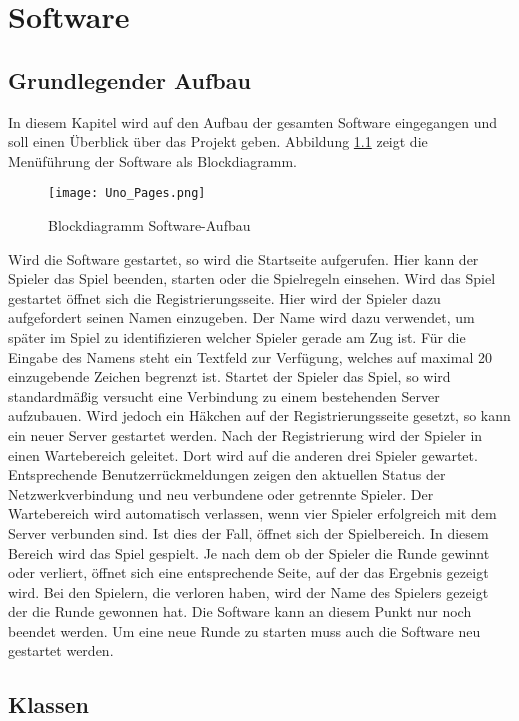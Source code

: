 
\chapter{Software}

\section{Grundlegender Aufbau}
In diesem Kapitel wird auf den Aufbau der gesamten Software eingegangen und soll einen Überblick über das Projekt geben. Abbildung \ref{fig:aufbau} zeigt die Menüführung der Software als Blockdiagramm. 
\begin{figure}[h]
	\begin{center}
		\texttt{[image: Uno\_Pages.png]}
		\caption{Blockdiagramm Software-Aufbau}
		\label{fig:aufbau}
	\end{center}
\end{figure}
Wird die Software gestartet, so wird die Startseite aufgerufen. Hier kann der Spieler das Spiel beenden, starten oder die Spielregeln einsehen. Wird das Spiel gestartet öffnet sich die Registrierungsseite. Hier wird der Spieler dazu aufgefordert seinen Namen einzugeben. Der Name wird dazu verwendet, um später im Spiel zu identifizieren welcher Spieler gerade am Zug ist. Für die Eingabe des Namens steht ein Textfeld zur Verfügung, welches auf maximal 20 einzugebende Zeichen begrenzt ist. Startet der Spieler das Spiel, so wird standardmäßig versucht eine Verbindung zu einem bestehenden Server aufzubauen. Wird jedoch ein Häkchen auf der Registrierungsseite gesetzt, so kann ein neuer Server gestartet werden. Nach der Registrierung wird der Spieler in einen Wartebereich geleitet. Dort wird auf die anderen drei Spieler gewartet. Entsprechende Benutzerrückmeldungen zeigen den aktuellen Status der Netzwerkverbindung und neu verbundene oder getrennte Spieler. Der Wartebereich wird automatisch verlassen, wenn vier Spieler erfolgreich mit dem Server verbunden sind. Ist dies der Fall, öffnet sich der Spielbereich. In diesem Bereich wird das Spiel gespielt. Je nach dem ob der Spieler die Runde gewinnt oder verliert, öffnet sich eine entsprechende Seite, auf der das Ergebnis gezeigt wird. Bei den Spielern, die verloren haben, wird der Name des Spielers gezeigt der die Runde gewonnen hat. Die Software kann an diesem Punkt nur noch beendet werden. Um eine neue Runde zu starten muss auch die Software neu gestartet werden.
\section{Klassen}

